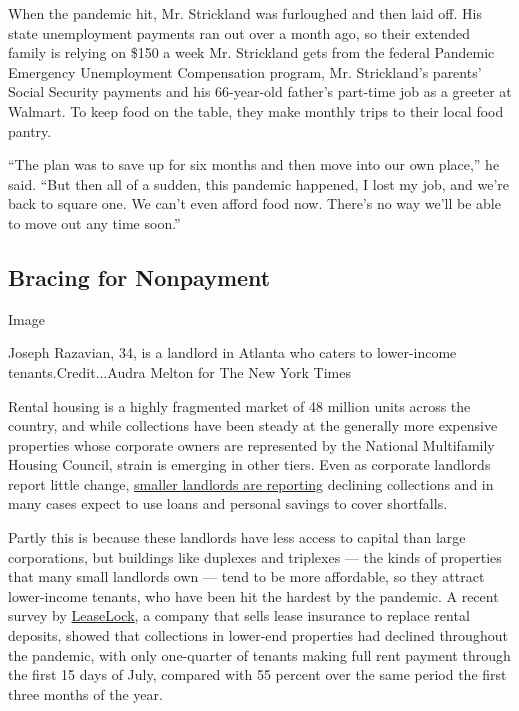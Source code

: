 When the pandemic hit, Mr. Strickland was furloughed and then laid off.
His state unemployment payments ran out over a month ago, so their
extended family is relying on \$150 a week Mr. Strickland gets from the
federal Pandemic Emergency Unemployment Compensation program, Mr.
Strickland's parents' Social Security payments and his 66-year-old
father's part-time job as a greeter at Walmart. To keep food on the
table, they make monthly trips to their local food pantry.

``The plan was to save up for six months and then move into our own
place,'' he said. ``But then all of a sudden, this pandemic happened, I
lost my job, and we're back to square one. We can't even afford food
now. There's no way we'll be able to move out any time soon.''

\hypertarget{bracing-for-nonpayment}{%
\subsection{Bracing for Nonpayment}\label{bracing-for-nonpayment}}

Image

Joseph Razavian, 34, is a landlord in Atlanta who caters to lower-income
tenants.Credit...Audra Melton for The New York Times

Rental housing is a highly fragmented market of 48 million units across
the country, and while collections have been steady at the generally
more expensive properties whose corporate owners are represented by the
National Multifamily Housing Council, strain is emerging in other tiers.
Even as corporate landlords report little change,
\href{https://nahrep.org/landlord-survey/}{smaller landlords are
reporting} declining collections and in many cases expect to use loans
and personal savings to cover shortfalls.

Partly this is because these landlords have less access to capital than
large corporations, but buildings like duplexes and triplexes --- the
kinds of properties that many small landlords own --- tend to be more
affordable, so they attract lower-income tenants, who have been hit the
hardest by the pandemic. A recent survey by
\href{https://leaselock.com/blog/class-c-rent-payments-covid-19/}{LeaseLock},
a company that sells lease insurance to replace rental deposits, showed
that collections in lower-end properties had declined throughout the
pandemic, with only one-quarter of tenants making full rent payment
through the first 15 days of July, compared with 55 percent over the
same period the first three months of the year.

